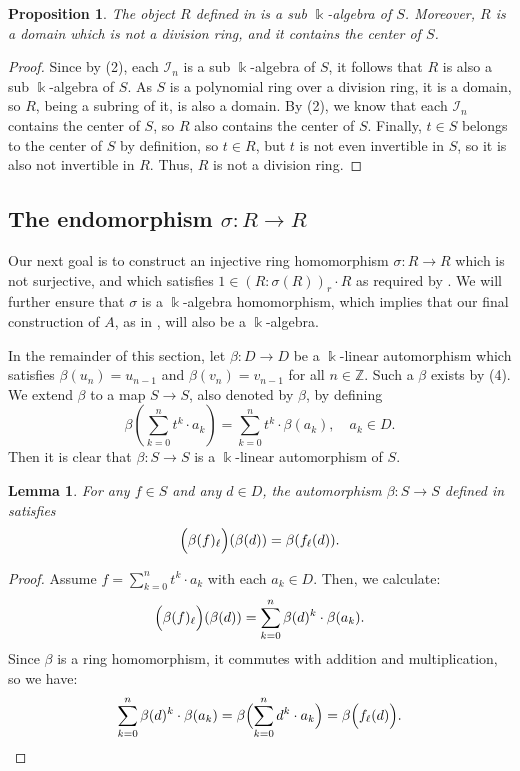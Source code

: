 \documentclass{amsart}
\newtheorem{prop}[equation]{Proposition}
\newtheorem{lem}[equation]{Lemma}
\theoremstyle{definition}
\renewcommand{\k}{\Bbbk}
\numberwithin{equation}{section}
\begin{document}
\begin{prop}\label{prop:rbasic}
The object $R$ defined in  is a sub $\k$-algebra of $S$.
Moreover, $R$ is a domain which is not a division ring,
and it contains the center of $S$.
\end{prop}
\begin{proof}
Since by (2), each $\mathcal{I}_n$ is a sub $\k$-algebra of $S$, it follows that $R$ is also a sub $\k$-algebra of $S$.
As $S$ is a polynomial ring over a division ring,
it is a domain, so $R$, being a subring of it,
is also a domain.
By (2), we know that each $\mathcal{I}_n$ contains the center of $S$,
so $R$ also contains the center of $S$.
Finally, $t \in S$ belongs to the center of $S$ by definition,
so $t \in R$, but $t$ is not even invertible in $S$,
so it is also not invertible in $R$. Thus, $R$ is not a division ring.
\end{proof}

\subsection{The endomorphism $\sigma:R \to R$}\label{sec:sigmaDef}

Our next goal is to construct an injective ring homomorphism $\sigma:R \to R$ which is not surjective, and which satisfies $1 \in (R:\sigma(R))_r\cdot R$ as required by .
We will further ensure that $\sigma$ is a $\k$-algebra homomorphism,
which implies that our final construction of $A$, as in ,  will also be a $\k$-algebra.

In the remainder of this section,
let $\beta:D \to D$ be a $\k$-linear automorphism which satisfies $\beta(u_n) = u_{n-1}$ and $\beta(v_n) = v_{n-1}$ for all $n \in \mathbb{Z}$. Such a $\beta$ exists by (4).
We extend $\beta$ to a map $S\to S$,
also denoted by $\beta$,
by defining
\begin{equation}\label{eqn:beta}
\beta\left(\sum_{k=0}^n t^k\cdot a_k\right) = \sum_{k=0}^n t^k \cdot \beta(a_k), \quad a_k \in D.
\end{equation}
Then it is clear that $\beta:S \to S$ is a $\k$-linear automorphism of $S$.

\begin{lem}\label{lem:betaofev}
For any $f \in S$ and any $d\in D$,
the automorphism $\beta:S \to S$ defined in  satisfies
\[
\Bigl(\beta(f)_{\ell}\Bigr) (\beta(d)) = \beta(f_{\ell}(d)).
\]
\end{lem}
\begin{proof}
Assume $f = \sum_{k=0}^n t^k\cdot a_k$ with each $a_k \in D$.
Then, we calculate:
\[
\Bigl(\beta(f)_{\ell}\Bigr) (\beta(d)) = 
\sum_{k=0}^n \beta(d)^k\cdot \beta(a_k).
\]
Since $\beta$ is a ring homomorphism,
it commutes with addition and multiplication,
so we have:
\[
\sum_{k=0}^n \beta(d)^k\cdot \beta(a_k) = 
\beta\Bigl(\sum_{k=0}^n d^k \cdot a_k\Bigr) = \beta\Bigl(f_{\ell}(d)\Bigr).
\]
\end{proof}
\end{document}

